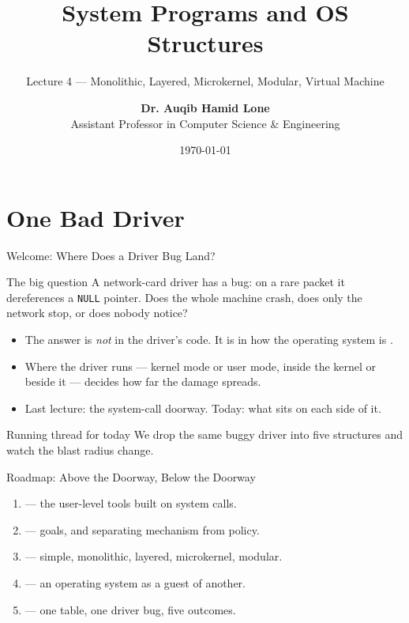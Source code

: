 \documentclass[aspectratio=169]{beamer}
\title{System Programs and OS Structures}
\subtitle{Lecture 4 --- Monolithic, Layered, Microkernel, Modular, Virtual Machine}
\author[Dr. Auqib Hamid Lone]{%
  \textbf{Dr. Auqib Hamid Lone}\\
  \small Assistant Professor in Computer Science \& Engineering
}
\institute[GCET Ganderbal]{%
  \small\textbf{PCC CS-502: Operating Systems}\\[0.3em]
  Department of Computer Science \& Engineering\\
  Government College of Engineering \& Technology (GCET), Ganderbal
}
\date[\today]{\small\today}
\begin{document}
\frame{\titlepage}

\section{One Bad Driver}

\begin{frame}{Welcome: Where Does a Driver Bug Land?}
  \begin{block}{The big question}
    A network-card driver has a bug: on a rare packet it dereferences a
    \texttt{NULL} pointer. Does the whole machine crash, does only the network
    stop, or does nobody notice?
  \end{block}
  \begin{itemize}
    \item The answer is \emph{not} in the driver's code. It is in how the
      operating system is .
    \item Where the driver runs --- kernel mode or user mode, inside the kernel
      or beside it --- decides how far the damage spreads.
    \item Last lecture: the system-call doorway. Today: what sits on each side of
      it.
  \end{itemize}
  \vspace{0.1cm}
  \begin{alertblock}{Running thread for today}
    We drop the same buggy driver into five structures and watch the blast
    radius change.
  \end{alertblock}
\end{frame}

\begin{frame}{Roadmap: Above the Doorway, Below the Doorway}
  \begin{enumerate}
    \item {} --- the user-level tools built on system calls.
    \item {} --- goals, and separating mechanism from
      policy.
    \item {} --- simple, monolithic, layered,
      microkernel, modular.
    \item {} --- an operating system as a guest of another.
    \item {} --- one table, one driver bug, five outcomes.
  \end{enumerate}
  \vspace{0.2cm}
\end{frame}
\end{document}

